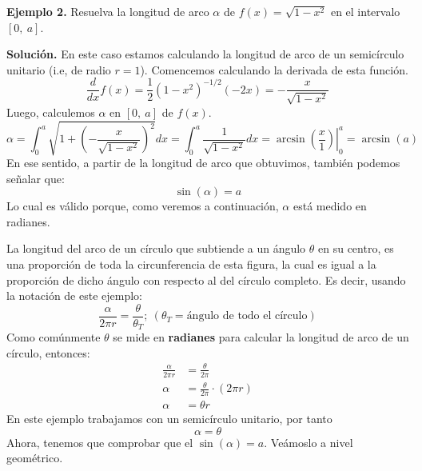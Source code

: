 \documentclass[12pt]{article}
\begin{document}
\textbf{Ejemplo 2.} Resuelva la longitud de arco $\alpha$ de $f(x) = \sqrt{1 - x^{2}}$ en el intervalo $[0, \ a]$.

\textbf{Solución.} En este caso estamos calculando la longitud de arco de un semicírculo unitario (i.e, de radio $r = 1$). Comencemos calculando la derivada de esta función.
\[
  \frac{d}{dx} f(x) = \frac{1}{2} (1 - x^{2})^{-1/2} (-2x) = - \frac{x}{\sqrt{1 - x^{2}}}
\]
Luego, calculemos $\alpha$ en $[0, \ a]$ de $f(x)$.
\[
  \alpha = \int_{0}^{a} \sqrt{1 + \left(- \frac{x}{\sqrt{1 - x^{2}}}\right)^{2}} dx
         = \int_{0}^{a} \frac{1}{\sqrt{1 - x^{2}}} dx
         = \left. \arcsin\left(\frac{x}{1}\right) \right|_{0}^{a}
         = \arcsin(a)
\]
En ese sentido, a partir de la longitud de arco que obtuvimos, también podemos señalar que:
\[
  \sin(\alpha) = a
\]
Lo cual es válido porque, como veremos a continuación, $\alpha$ está medido en radianes.

La longitud del arco de un círculo que subtiende a un ángulo $\theta$ en su centro, es una proporción de toda la circunferencia de esta figura, la cual es igual a la proporción de dicho ángulo con respecto al del círculo completo. Es decir, usando la notación de este ejemplo:
\[
  \frac{\alpha}{2 \pi r} = \frac{\theta}{\theta_{T}}; \ (\theta_{T} = \text{ángulo de todo el círculo})
\]
Como comúnmente $\theta$ se mide en \textbf{radianes} para calcular la longitud de arco de un círculo, entonces:
\begin{align*}
  \frac{\alpha}{2 \pi r} &= \frac{\theta}{2 \pi} \\
  \alpha &= \frac{\theta}{2 \pi} \cdot (2 \pi r) \\
  \alpha &= \theta r
\end{align*}
En este ejemplo trabajamos con un semicírculo unitario, por tanto
\[
  \alpha = \theta
\]
Ahora, tenemos que comprobar que el $\sin(\alpha) = a$. Veámoslo a nivel geométrico.
\end{document}
